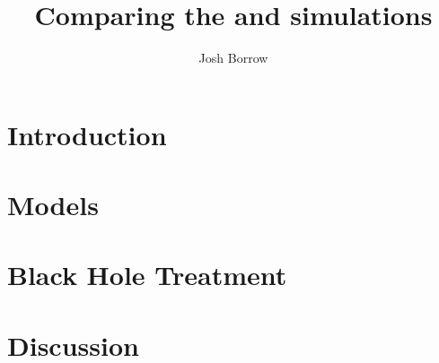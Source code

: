\documentclass[a4paper]{article}
\author{Josh Borrow}
\title{Comparing the \hagn{} and \fire{} simulations}
\begin{document}
\maketitle

\section{Introduction}\label{sec:intro}


\section{Models}\label{sec:models}


\section{Black Hole Treatment}\label{sec:bhs}


\section{Discussion}\label{sec:discussion}



\end{document}
